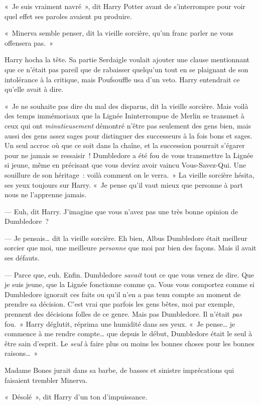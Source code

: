 «~Je suis vraiment navré~», dit Harry Potter avant de s'interrompre pour voir quel effet ses paroles avaient pu produire.

«~Minerva semble penser, dit la vieille sorcière, qu'un franc parler ne vous offensera pas.~»

Harry hocha la tête.
Sa partie Serdaigle voulait ajouter une clause mentionnant que ce n'était pas pareil que de rabaisser quelqu'un tout en se plaignant de son intolérance à la critique, mais Poufsouffle usa d'un veto.
Harry entendrait ce qu'elle avait à dire.

«~Je ne souhaite pas dire du mal des disparus, dit la vieille sorcière.
Mais voilà des temps immémoriaux que la Lignée Ininterrompue de Merlin se transmet à ceux qui ont \emph{minutieusement} démontré n'être pas seulement des gens bien, mais aussi des gens assez sages pour distinguer des successeurs à la fois bons et sages.
Un seul accroc où que ce soit dans la chaîne, et la succession pourrait s'égarer pour ne jamais se ressaisir~!
Dumbledore a été fou de vous transmettre la Lignée si jeune, même en précisant que vous deviez avoir vaincu Vous-Savez-Qui.
Une souillure de son héritage~: voilà comment on le verra.~»
La vieille sorcière hésita, ses yeux toujours sur Harry.
«~Je pense qu'il vaut mieux que personne à part nous ne l'apprenne jamais.

--- Euh, dit Harry.
J'imagine que vous n'avez pas une très bonne opinion de Dumbledore~?

--- Je pensais… dit la vieille sorcière.
Eh bien, Albus Dumbledore était meilleur sorcier que moi, une meilleure \emph{personne} que moi par bien des façons.
Mais il avait ses défauts.

--- Parce que, euh.
Enfin. Dumbledore \emph{savait} tout ce que vous venez de dire.
Que je suis jeune, que la Lignée fonctionne comme ça.
Vous vous comportez comme si Dumbledore ignorait ces faits ou qu'il n'en a pas tenu compte au moment de prendre sa décision.
C'est vrai que parfois les gens bêtes, moi par exemple, prennent des décisions folles de ce genre.
Mais pas Dumbledore.
Il n'était \emph{pas} fou.~»
Harry déglutit, réprima une humidité dans ses yeux.
«~Je pense… je commence à me rendre compte… que depuis le début, Dumbledore était le seul à être sain d'esprit.
Le \emph{seul} à faire plus ou moins les bonnes choses pour les bonnes raisons…~»

Madame Bones jurait dans sa barbe, de basses et sinistre imprécations qui faisaient trembler Minerva.

«~Désolé~», dit Harry d'un ton d'impuissance.

